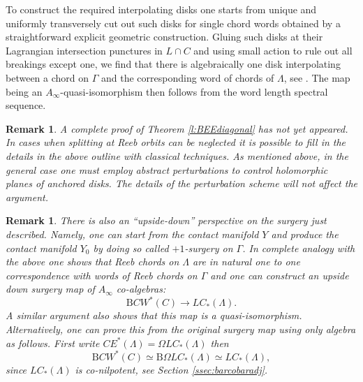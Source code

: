 \documentclass{gtpart}
\newtheorem{rem}[thm]{Remark}
\renewcommand{\Bar}{\mathrm{B}}
\begin{document}
To construct the required interpolating disks one starts from unique and uniformly transversely cut out such disks for single chord words obtained by a straightforward explicit geometric construction. Gluing such disks at their Lagrangian intersection punctures in $L\cap C$ and using small action to rule out all breakings except one, we find that there is algebraically one disk interpolating between a chord on $\Gamma$ and the corresponding word of chords of $\Lambda$, see \cite{BEEfuture}.
The map being an $A_{\infty}$-quasi-isomorphism then follows from the word length spectral sequence.

\begin{rem}
A complete proof of Theorem \ref{l:BEEdiagonal}	has not yet appeared. In cases when splitting at Reeb orbits can be neglected it is possible to fill in the details in the above outline with classical techniques. As mentioned above, in the general case one must employ abstract perturbations to control holomorphic planes of anchored disks. The details of the perturbation scheme will not affect the argument. 
\end{rem}

\begin{rem}
There is also an ``upside-down'' perspective on the surgery just described. Namely, one can start from
    the contact manifold $Y$ and produce the contact manifold $Y_{0}$ by doing so called
    $+1$-surgery on $\Gamma$. In complete analogy with the above one shows that Reeb chords on
    $\Lambda$ are in natural one to one correspondence with words of Reeb chords on $\Gamma$ and one
    can construct an upside down surgery map of $A_\infty$ co-algebras:
\[ 
\Bar CW^{\ast}(C) \to LC_{\ast}(\Lambda).
\]
A similar argument also shows that this map is a quasi-isomorphism. Alternatively, one can prove this from the original surgery map using only algebra as follows. First write $CE^{\ast}(\Lambda)=\Omega LC_{\ast}(\Lambda)$ then
\[ 
\Bar CW^{\ast}(C) \simeq \Bar \Omega LC_{\ast}(\Lambda) \simeq  LC_{\ast}(\Lambda),
\]
since $LC_{\ast}(\Lambda)$ is co-nilpotent, see Section \ref{ssec:barcobaradj}.
\end{rem}
\end{document}
